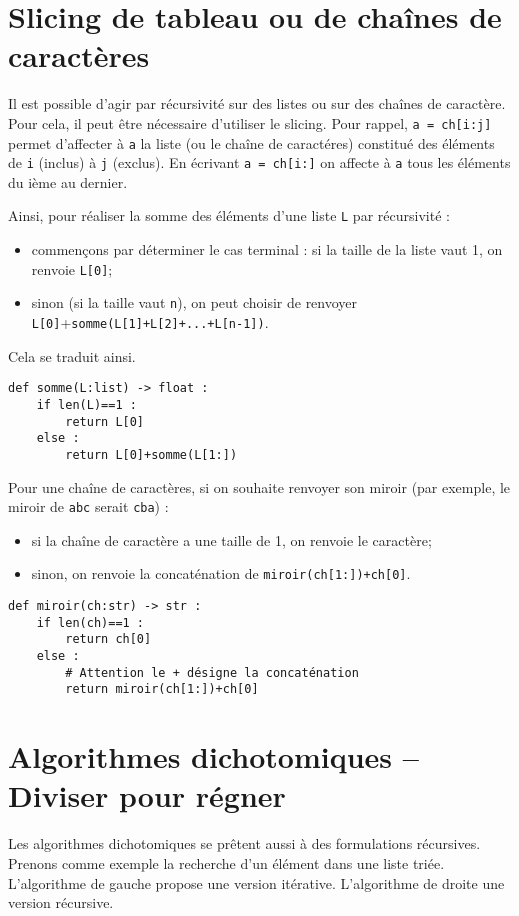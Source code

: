 \section{Slicing de tableau ou de chaînes de caractères}
Il est possible d'agir par récursivité sur des listes ou sur des chaînes de caractère. Pour cela, il peut être nécessaire d'utiliser le slicing. Pour rappel, \texttt{a = ch[i:j]} permet d'affecter à \texttt{a} la liste (ou le chaîne de caractéres) constitué des éléments de \texttt{i} (inclus) à \texttt{j} (exclus). En écrivant \texttt{a = ch[i:]} on affecte à \texttt{a} tous les éléments du ième au dernier.



Ainsi, pour réaliser la somme des éléments d'une liste \texttt{L} par récursivité : 
\begin{itemize}
\item commençons par déterminer le cas terminal : si la taille de la liste vaut 1, on renvoie \texttt{L[0]};
\item sinon (si la taille vaut \texttt{n}), on peut choisir de renvoyer \texttt{L[0]}+\texttt{somme(L[1]+L[2]+...+L[n-1])}. 
\end{itemize}
Cela se traduit ainsi.
\begin{lstlisting}
def somme(L:list) -> float :
    if len(L)==1 : 
        return L[0]
    else :
        return L[0]+somme(L[1:])
\end{lstlisting}

Pour une chaîne de caractères, si on souhaite renvoyer son miroir (par exemple, le miroir de \texttt{abc} serait \texttt{cba}) : 
\begin{itemize}
\item si la chaîne de caractère a une taille de 1, on renvoie le caractère;
\item sinon, on renvoie la concaténation de  \texttt{miroir(ch[1:])+ch[0]}.
\end{itemize}
\begin{lstlisting}
def miroir(ch:str) -> str :
    if len(ch)==1 : 
        return ch[0]
    else :
        # Attention le + désigne la concaténation
        return miroir(ch[1:])+ch[0]
 \end{lstlisting}  


\section{Algorithmes dichotomiques -- Diviser pour régner}

Les algorithmes dichotomiques se prêtent aussi à des formulations récursives. Prenons comme exemple la recherche d'un élément dans une liste triée. L'algorithme de gauche propose une version itérative. L'algorithme de droite une version récursive. 

